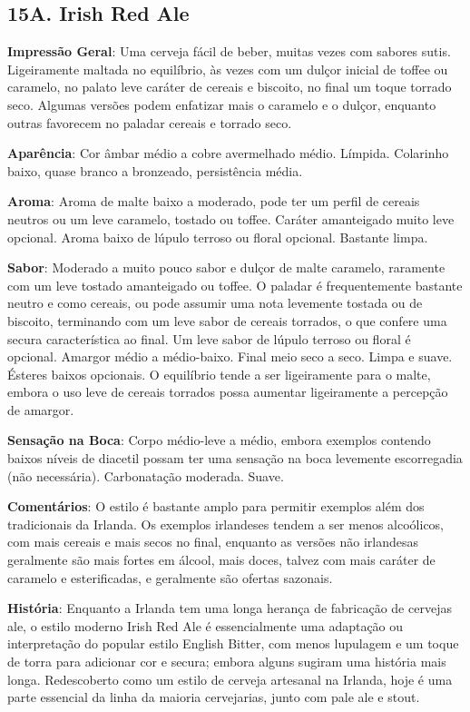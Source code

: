 \subsection*{15A. Irish Red Ale}

\textbf{Impressão Geral}: Uma cerveja fácil de beber, muitas vezes com sabores sutis. Ligeiramente maltada no equilíbrio, às vezes com um dulçor inicial de toffee ou caramelo, no palato leve caráter de cereais e biscoito, no final um toque torrado seco. Algumas versões podem enfatizar mais o caramelo e o dulçor, enquanto outras favorecem no paladar cereais e torrado seco.

\textbf{Aparência}: Cor âmbar médio a cobre avermelhado médio. Límpida. Colarinho baixo, quase branco a bronzeado, persistência média.

\textbf{Aroma}: Aroma de malte baixo a moderado, pode ter um perfil de cereais neutros ou um leve caramelo, tostado ou toffee. Caráter amanteigado muito leve opcional. Aroma baixo de lúpulo terroso ou floral opcional. Bastante limpa.

\textbf{Sabor}: Moderado a muito pouco sabor e dulçor de malte caramelo, raramente com um leve tostado amanteigado ou toffee. O paladar é frequentemente bastante neutro e como cereais, ou pode assumir uma nota levemente tostada ou de biscoito, terminando com um leve sabor de cereais torrados, o que confere uma secura característica ao final. Um leve sabor de lúpulo terroso ou floral é opcional. Amargor médio a médio-baixo. Final meio seco a seco. Limpa e suave. Ésteres baixos opcionais. O equilíbrio tende a ser ligeiramente para o malte, embora o uso leve de cereais torrados possa aumentar ligeiramente a percepção de amargor.

\textbf{Sensação na Boca}: Corpo médio-leve a médio, embora exemplos contendo baixos níveis de diacetil possam ter uma sensação na boca levemente escorregadia (não necessária). Carbonatação moderada. Suave.

\textbf{Comentários}: O estilo é bastante amplo para permitir exemplos além dos tradicionais da Irlanda. Os exemplos irlandeses tendem a ser menos alcoólicos, com mais cereais e mais secos no final, enquanto as versões não irlandesas geralmente são mais fortes em álcool, mais doces, talvez com mais caráter de caramelo e esterificadas, e geralmente são ofertas sazonais.

\textbf{História}: Enquanto a Irlanda tem uma longa herança de fabricação de cervejas ale, o estilo moderno Irish Red Ale é essencialmente uma adaptação ou interpretação do popular estilo English Bitter, com menos lupulagem e um toque de torra para adicionar cor e secura; embora alguns sugiram uma história mais longa. Redescoberto como um estilo de cerveja artesanal na Irlanda, hoje é uma parte essencial da linha da maioria cervejarias, junto com pale ale e stout.

